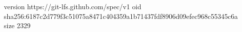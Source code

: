 version https://git-lfs.github.com/spec/v1
oid sha256:6187c2d779f3c51075a8471c404359a1b71437fdf8906d09efec968c55345c6a
size 2329
